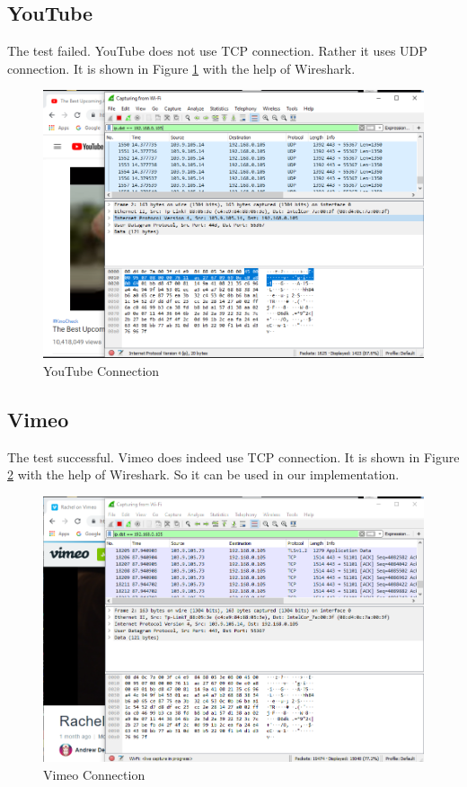 \documentclass[14pt]{extarticle}
\begin{document}
    \subsection{YouTube}
    The test failed. YouTube does not use TCP connection. Rather it uses UDP connection. It is shown in Figure \ref{fig:youtube} with the help of Wireshark.
    \begin{figure}
        \centering
        \includegraphics[width=.95\textwidth]{Pictures/Youtube_test.png}
        \caption{YouTube Connection}
        \label{fig:youtube}
    \end{figure}
    
    
    \subsection{Vimeo}
    The test successful. Vimeo does indeed use TCP connection. It is shown in Figure \ref{fig:vimeo} with the help of Wireshark. So it can be used in our implementation.
    \begin{figure}
        \centering
        \includegraphics[width=.95\textwidth]{Pictures/Vimeo_test.png}
        \caption{Vimeo Connection}
        \label{fig:vimeo}
    \end{figure}
    
\end{document}
